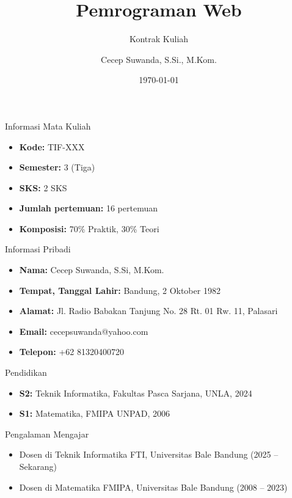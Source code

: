 \documentclass[handout]{beamer}
\title{Pemrograman Web}
\subtitle{Kontrak Kuliah}
\author{Cecep Suwanda, S.Si., M.Kom.}
\institute{Universitas Bale Bandung}
\date{\today}
\begin{document}
	
	\begin{frame}
		\titlepage
	\end{frame}
	
	\begin{frame}{Informasi Mata Kuliah}
		\begin{itemize}
			\item \textbf{Kode:} TIF-XXX
			\item \textbf{Semester:} 3 (Tiga)
			\item \textbf{SKS:} 2 SKS
			\item \textbf{Jumlah pertemuan:} 16 pertemuan
			\item \textbf{Komposisi:} 70\% Praktik, 30\% Teori
		\end{itemize}
	\end{frame}
	
	\begin{frame}{Informasi Pribadi}
		
		\begin{itemize}
			\item \textbf{Nama:} Cecep Suwanda, S.Si, M.Kom.
			\item \textbf{Tempat, Tanggal Lahir:} Bandung, 2 Oktober 1982
			\item \textbf{Alamat:} Jl. Radio Babakan Tanjung No. 28 Rt. 01 Rw. 11, Palasari
			\item \textbf{Email:} cecepsuwanda@yahoo.com
			\item \textbf{Telepon:} +62 81320400720
		\end{itemize}
	\end{frame}
	
	\begin{frame}{Pendidikan}
		\begin{itemize}
			\item \textbf{S2:} Teknik Informatika, Fakultas Pasca Sarjana, UNLA, 2024
			\item \textbf{S1:} Matematika, FMIPA UNPAD, 2006
		\end{itemize}
	\end{frame}
	
	\begin{frame}{Pengalaman Mengajar}
		\begin{itemize}
			\item Dosen di Teknik Informatika FTI, Universitas Bale Bandung (2025 -- Sekarang)
			\item Dosen di Matematika FMIPA, Universitas Bale Bandung (2008 -- 2023)
		\end{itemize}
	\end{frame}
\end{document}

